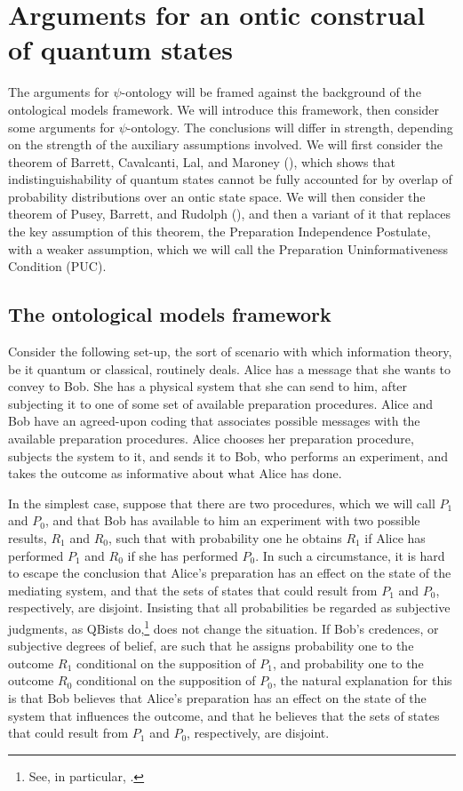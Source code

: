 \documentclass[12pt]{article}
\begin{document}
\section{Arguments for an ontic construal  of quantum states}\label{PsiOnt}
The arguments for $\psi$-ontology will be framed against the background of the ontological models framework.  We will introduce this framework, then consider some arguments for  $\psi$-ontology.  The conclusions will differ in strength, depending on the strength of the auxiliary assumptions involved.   We will first consider the theorem of Barrett, Cavalcanti, Lal, and Maroney (\citeyear{BCLM}), which shows that indistinguishability of quantum states cannot be fully accounted for by overlap of probability distributions over an ontic state space. We will then consider the theorem of Pusey, Barrett, and Rudolph (\citeyear{PBR}), and then a variant of it that replaces the key assumption of this theorem, the Preparation Independence Postulate, with a weaker assumption, which we will call the Preparation Uninformativeness Condition (PUC).

\subsection{The ontological models framework}   Consider the following set-up, the sort of scenario with which information theory, be it quantum or classical, routinely deals.  Alice has a message that she wants to convey to Bob.  She has a physical system that she can send to him, after subjecting it to one of some set of available preparation procedures.  Alice and Bob have an agreed-upon coding that associates possible messages with the available preparation procedures.  Alice chooses her preparation procedure, subjects the system to it, and sends it to Bob, who performs an experiment, and takes the outcome as informative about what Alice has done.

In the simplest case, suppose that there are two procedures, which we will call $P_1$ and $P_0$,  and that Bob has available to him an experiment  with two possible results, $R_1$ and $R_0$, such that with probability one he obtains $R_1$ if Alice has performed $P_1$ and $R_0$ if she has performed $P_0$.  In such a circumstance, it is hard to escape the conclusion that Alice's preparation has an effect on the state of the mediating system, and that the sets of   states that could result from $P_1$ and $P_0$, respectively, are disjoint.  Insisting that all probabilities be regarded as subjective judgments, as QBists do,\footnote{See, in particular, \citet{CFS2007}.} does not change the situation.  If Bob's credences, or subjective degrees of belief, are such that he assigns probability one to the outcome $R_1$ conditional on the supposition of $P_1$, and  probability one to the outcome $R_0$ conditional on the supposition of $P_0$, the natural explanation for this is that Bob believes that Alice's preparation has an effect on the state of the system that influences the outcome, and that he believes that the sets of states that could result from $P_1$ and $P_0$, respectively, are disjoint.
\end{document}
